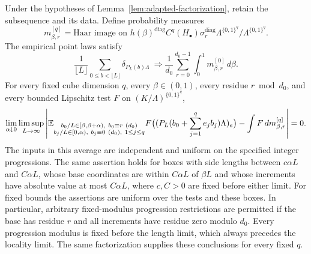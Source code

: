 \begin{proposition}
\label{prop:local-cube-law}
Under the hypotheses of Lemma~\ref{lem:adapted-factorization}, retain the
subsequence and its data.  Define probability measures
\begin{equation}
 m_{\beta,r}^{[q]}
 =\text{Haar image on }
 h(\beta)^{\mathrm{diag}} C^q(H_\bullet)
 \sigma_r^{\mathrm{diag}}\Lambda^{\{0,1\}^q}/
              \Lambda^{\{0,1\}^q}.
 \label{eq:local-cube-haar}
\end{equation}
The empirical point laws satisfy
\begin{equation}
 \frac1{\lfloor L\rfloor}\sum_{0\leq b<\lfloor L\rfloor}
       \delta_{P_L(b)\Lambda}
 \ \Longrightarrow
 \frac1{d_0}\sum_{r=0}^{d_0-1}\int_0^1 m_{\beta,r}^{[0]}\,d\beta.
 \label{eq:joint-point-law}
\end{equation}
For every fixed cube dimension $q$, every $\beta\in(0,1)$, every residue
$r\bmod d_0$, and every bounded Lipschitz test $F$ on
$(K/\Lambda)^{\{0,1\}^q}$,
\begin{equation}
 \lim_{\alpha\downarrow0}\limsup_{L\to\infty}
 \left|
 \mathbb E_{\substack{b_0/L\in[\beta,\beta+\alpha),\ b_0\equiv r\ (d_0)\\
                 b_j/L\in[0,\alpha),\ b_j\equiv0\ (d_0),\ 1\leq j\leq q}}
 F\bigl((P_L(b_0+\sum_{j=1}^q e_jb_j)\Lambda)_e\bigr)
 -\int F\,dm_{\beta,r}^{[q]}
 \right|=0.
 \label{eq:local-cube-limit-order}
\end{equation}
The inputs in this average are independent and uniform on the specified
integer progressions.  The same assertion holds for boxes with side
lengths between $c\alpha L$ and $C\alpha L$, whose base coordinates
are within $C\alpha L$ of $\beta L$ and whose increments have
absolute value at most $C\alpha L$, where $c,C>0$ are fixed before
either limit.
For fixed bounds the assertions are uniform over the tests and these
boxes.  In particular, arbitrary fixed-modulus progression restrictions
are permitted if the base has residue $r$ and all increments have residue
zero modulo $d_0$.  Every progression modulus is fixed before the
length limit, which always precedes the locality limit.
The same factorization supplies these conclusions for every fixed $q$.
\end{proposition}

